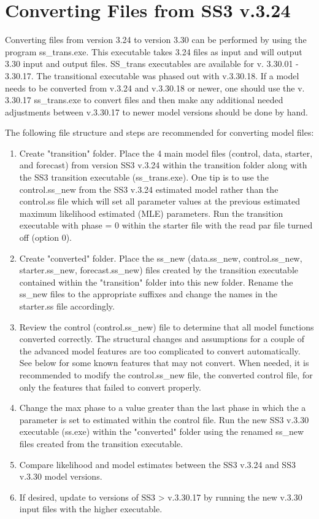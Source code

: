\hypertarget{ConvIssues}{}
\section{Converting Files from SS3 v.3.24}
Converting files from version 3.24 to version 3.30 can be performed by using the program ss\_trans.exe. This executable takes 3.24 files as input and will output 3.30 input and output files. SS\_trans executables are available for v. 3.30.01 - 3.30.17. The transitional executable was phased out with v.3.30.18. If a model needs to be converted from v.3.24 and v.3.30.18 or newer, one should use the v. 3.30.17 ss\_trans.exe to convert files and then make any additional needed adjustments between v.3.30.17 to newer model versions should be done by hand.  

The following file structure and steps are recommended for converting model files:
\begin{enumerate}
	\item Create "transition" folder.  Place the 4 main model files (control, data, starter, and forecast) from version SS3 v.3.24 within the transition folder along with the SS3 transition executable (ss\_trans.exe).  One tip is to use the control.ss\_new from the SS3 v.3.24 estimated model rather than the control.ss file which will set all parameter values at the previous estimated maximum likelihood estimated (MLE) parameters.  Run the transition executable with phase = 0 within the starter file with the read par file turned off (option 0).
	
	\item Create "converted" folder.  Place the ss\_new (data.ss\_new, control.ss\_new, starter.ss\_new, forecast.ss\_new) files created by the transition executable contained within the "transition" folder into this new folder.  Rename the ss\_new files to the appropriate suffixes and change the names in the starter.ss file accordingly.
	
	\item Review the control (control.ss\_new) file to determine that all model functions converted correctly.  The structural changes and assumptions for a couple of the advanced model features are too complicated to convert automatically.  See below for some known features that may not convert. When needed, it is recommended to modify the control.ss\_new file, the converted control file, for only the features that failed to convert properly.
	
	\item Change the max phase to a value greater than the last phase in which the a parameter is set to estimated within the control file.  Run the new SS3 v.3.30 executable (ss.exe) within the "converted" folder using the renamed ss\_new files created from the transition executable.
	
	\item Compare likelihood and model estimates between the SS3 v.3.24 and SS3 v.3.30 model versions.
	
	\item If desired, update to versions of SS3 > v.3.30.17 by running the new v.3.30 input files with the higher executable.
\end{enumerate}

